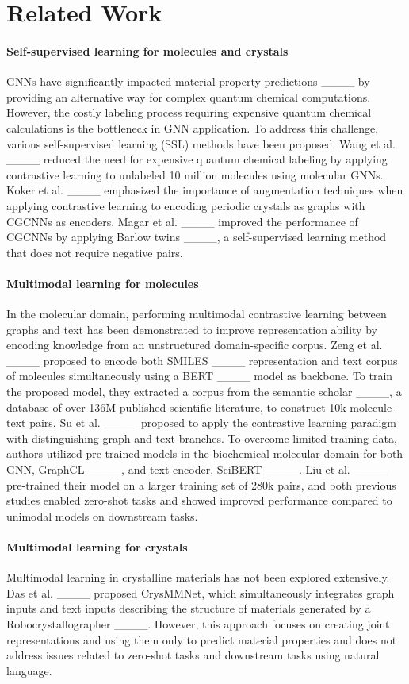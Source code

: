 \section{Related Work}
\paragraph{Self-supervised learning for molecules and crystals}

GNNs have significantly impacted material property predictions ____ by providing an alternative way for complex quantum chemical computations. However, the costly labeling process requiring expensive quantum chemical calculations is the bottleneck in GNN application. To address this challenge, various self-supervised learning (SSL) methods have been proposed. Wang et al. ____ reduced the need for expensive quantum chemical labeling by applying contrastive learning to unlabeled 10 million molecules using molecular GNNs. Koker et al. ____ emphasized the importance of augmentation techniques when applying contrastive learning to encoding periodic crystals as graphs with CGCNNs as encoders. Magar et al. ____ improved the performance of CGCNNs by applying Barlow twins ____, a self-supervised learning method that does not require negative pairs.

\paragraph{Multimodal learning for molecules}
In the molecular domain, performing multimodal contrastive learning between graphs and text has been demonstrated to improve representation ability by encoding knowledge from an unstructured domain-specific corpus. Zeng et al. ____ proposed to encode both SMILES ____ representation and text corpus of molecules simultaneously using a BERT ____ model as backbone. To train the proposed model, they extracted a corpus from the semantic scholar ____, a database of over 136M published scientific literature, to construct 10k molecule-text pairs. Su et al. ____ proposed to apply the contrastive learning paradigm with distinguishing graph and text branches. To overcome limited training data, authors utilized pre-trained models in the biochemical molecular domain for both GNN, GraphCL ____, and text encoder, SciBERT ____. Liu et al. ____ pre-trained their model on a larger training set of 280k pairs, and both previous studies enabled zero-shot tasks and showed improved performance compared to unimodal models on downstream tasks.

\paragraph{Multimodal learning for crystals}
Multimodal learning in crystalline materials has not been explored extensively. Das et al. ____ proposed CrysMMNet, which simultaneously integrates graph inputs and text inputs describing the structure of materials generated by a Robocrystallographer ____. However, this approach focuses on creating joint representations and using them only to predict material properties and does not address issues related to zero-shot tasks and downstream tasks using natural language.